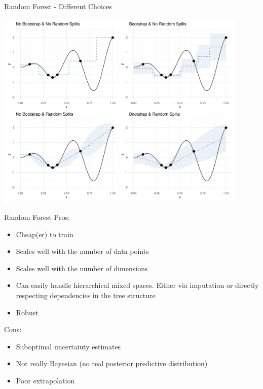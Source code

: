 \documentclass[11pt,compress,t,notes=noshow, xcolor=table]{beamer}
\begin{document}
\begin{frame}{Random Forest - Different Choices}

\begin{center}
  \includegraphics[width = 0.9\textwidth]{figure_man/surrogate_1.png}
\end{center}

\end{frame}

\begin{frame}{Random Forest}
Pros:
\begin{itemize}
  \item Cheap(er) to train
  \item Scales well with the number of data points
  \item Scales well with the number of dimensions
  \item Can easily handle hierarchical mixed spaces. Either via imputation or directly respecting dependencies in the tree structure
  \item Robust
\end{itemize}
Cons:
\begin{itemize}
  \item Suboptimal uncertainty estimates
  \item Not really Bayesian (no real posterior predictive distribution)
  \item Poor extrapolation
\end{itemize}
\end{frame}
\end{document}
